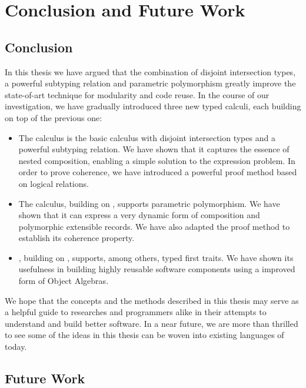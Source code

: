 \chapter{Conclusion and Future Work}
\label{chap:conclusion}



\section{Conclusion}

In this thesis we have argued that the combination of disjoint intersection
types, a powerful subtyping relation and parametric polymorphism greatly improve
the state-of-art technique for modularity and code reuse. In the course of our
investigation, we have gradually introduced three new typed calculi, each
building on top of the previous one:
\begin{itemize}
\item The \namee calculus is the basic calculus with disjoint intersection types
  and a powerful subtyping relation. We have shown that it captures the essence
  of nested composition, enabling a simple solution to the expression problem.
  In order to prove coherence, we have introduced a powerful proof method based
  on logical relations.
\item The \fnamee calculus, building on \namee, supports parametric
  polymorphism. We have shown that it can express a very dynamic form of
  composition and polymorphic extensible records. We have also adapted the proof
  method to establish its coherence property.
\item \sedel, building on \fnamee, supports, among others, typed first traits.
  We have shown its usefulness in building highly reusable software components
  using a improved form of Object Algebras.
\end{itemize}

We hope that the concepts and the methods described in this thesis may serve as
a helpful guide to researches and programmers alike in their attempts to
understand and build better software. In a near future, we are more than
thrilled to see some of the ideas in this thesis can be woven into existing languages
of today.


\section{Future Work}

